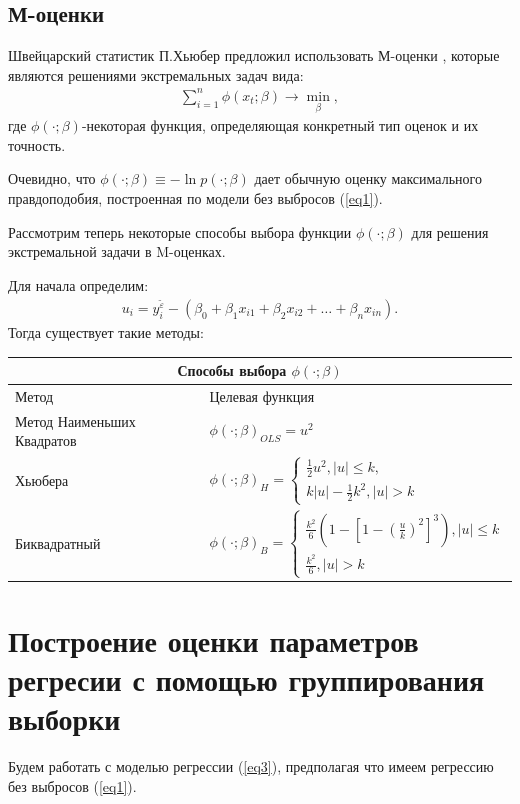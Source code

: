 \documentclass[a4paper,14pt]{extarticle}
\begin{document}
\subsection{М-оценки}
Швейцарский статистик П.Хьюбер предложил использовать М-оценки \cite{Kharin}, которые являются решениями экстремальных задач вида:
\begin{eqnarray}
    \sum_{i=1}^{n}\phi(x_t;\beta)\rightarrow \min_{\beta},
\end{eqnarray}
где $\phi(\cdot;\beta)$-некоторая функция, определяющая конкретный тип оценок и их точность.

Очевидно, что $\phi(\cdot;\beta)\equiv - \ln{p(\cdot;\beta)}$ дает обычную оценку максимального правдоподобия, построенная по модели без выбросов (\ref{eq1}).

Рассмотрим теперь некоторые способы выбора функции $\phi(\cdot;\beta)$ для решения экстремальной задачи в M-оценках.

Для начала определим:
\begin{eqnarray}
    u_i=y_i^{\widetilde{\varepsilon}}-(\beta_0+\beta_1 x_{i1}+\beta_2 x_{i2}+\dots+\beta_n x_{in}).
\end{eqnarray}
Тогда существует такие методы\cite{RobustRegression}:\hfill\break
\begin{center}
\begin{tabular}{ |p{3cm}|p{10cm} | }
    \hline
    \multicolumn{2}{|c|}{Способы выбора $\phi(\cdot;\beta)$} \\
    \hline
    Метод& Целевая функция\\
    \hline
    Метод Наименьших Квадратов&$\phi(\cdot;\beta)_{OLS}=u^2$\\
    \hline
    Хьюбера&$\phi(\cdot;\beta)_{H}=
        \begin{cases}
            \frac{1}{2}u^2, |u|\leq k,\\
            k|u|-\frac{1}{2}k^2, |u|>k
        \end{cases}$\\
    \hline
    Биквадратный& $\phi(\cdot;\beta)_{B}=
    \begin{cases}
        \frac{k^2}{6}(1-[1-(\frac{u}{k})^2]^3), |u|\leq k\\
        \frac{k^2}{6}, |u|>k
    \end{cases}$\\
    \hline
\end{tabular}
\end{center}
\newpage

\section{Построение оценки параметров регресии с помощью группирования выборки}\label{sec4}
Будем работать с моделью регрессии (\ref{eq3}), предполагая что имеем регрессию без выбросов (\ref{eq1}). 
\end{document}
